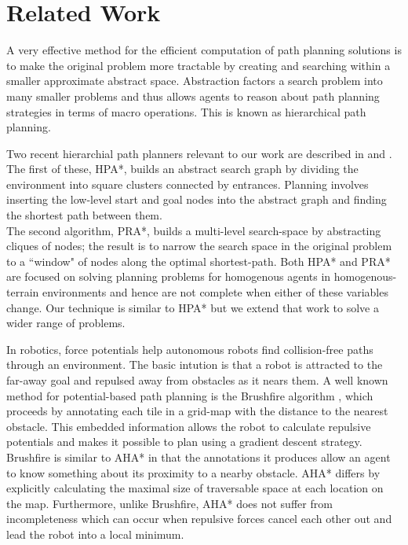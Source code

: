\section{Related Work}
A very effective method for the efficient computation of path planning solutions is to make the original problem more tractable by creating and searching within a smaller approximate abstract space. Abstraction factors a search problem into many smaller problems and thus allows agents to reason about path planning strategies in terms of macro operations. This is known as hierarchical path planning. 
\par
\indent Two recent hierarchial path planners relevant to our work are described in \cite{botea04} and \cite{sturtevant05}. The first of these, HPA*, builds an  abstract search graph by dividing the environment into square clusters connected by entrances. Planning involves inserting the low-level start and goal nodes into the abstract graph and finding the shortest path between them. \\
The second algorithm, PRA*, builds a multi-level search-space by abstracting cliques of nodes; the result is to narrow the search space in the original problem to a ``window" of nodes along the optimal shortest-path.
Both HPA* and PRA* are focused on solving planning problems for homogenous agents in homogenous-terrain environments and hence are not complete when either of these variables change. 
Our technique is similar to HPA* but we extend that work to solve a wider range of problems. 
\par 
\indent In robotics, force potentials help autonomous robots find collision-free paths through an environment. The basic intution is that a robot is attracted to the far-away goal and repulsed away from obstacles as it nears them. A well known method for potential-based path planning is the Brushfire algorithm \cite{latombe91}, which proceeds by annotating each tile in a grid-map with the distance to the nearest obstacle. This embedded information allows the robot to calculate repulsive potentials and makes it possible to plan using a gradient descent strategy. 
Brushfire is similar to AHA* in that the annotations it produces allow an agent to know something about its proximity to a nearby obstacle. 
AHA* differs by explicitly calculating the maximal size of traversable space at each location on the map. 
Furthermore, unlike Brushfire, AHA* does not suffer from incompleteness which can occur when repulsive forces cancel each other out and lead the robot into a local minimum. 
\par
